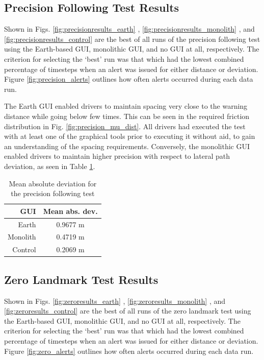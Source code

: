 \subsection{Precision Following Test Results} \label{sec:precisionfollowingresults}

Shown in Figs. \ref{fig:precisionresults_earth} , \ref{fig:precisionresults_monolith} , and \ref{fig:precisionresults_control} are the best of all runs of the precision following test using the Earth-based GUI, monolithic GUI, and no GUI at all, respectively. The criterion for selecting the `best' run was that which had the lowest combined percentage of timesteps when an alert was issued for either distance or deviation. Figure \ref{fig:precision_alerts} outlines how often alerts occurred during each data run.

The Earth GUI enabled drivers to maintain spacing very close to the warning distance while going below few times. This can be seen in the required friction distribution in Fig. \ref{fig:precision_mu_dist}. All drivers had executed the test with at least one of the graphical tools prior to executing it without aid, to gain an understanding of the spacing requirements. Conversely, the monolithic GUI enabled drivers to maintain higher precision with respect to lateral path deviation, as seen in Table \ref{tab:precision_dev_mean}. 

\begin{table}[htbp] \centering \caption{Mean absolute deviation for the precision following test}
\begin{tabular}{r|c} 
    GUI&    Mean abs. dev. \\ \hline\hline
    Earth&      0.9677 m \\
    Monolith&   0.4719 m \\
    Control&    0.2069 m \\ \hline   
\end{tabular} \label{tab:precision_dev_mean} \end{table}



\subsection{Zero Landmark Test Results} \label{sec:zerolandmarkresults}

Shown in Figs. \ref{fig:zeroresults_earth} , \ref{fig:zeroresults_monolith} , and \ref{fig:zeroresults_control} are the best of all runs of the zero landmark test using the Earth-based GUI, monolithic GUI, and no GUI at all, respectively. The criterion for selecting the `best' run was that which had the lowest combined percentage of timesteps when an alert was issued for either distance or deviation. Figure \ref{fig:zero_alerts} outlines how often alerts occurred during each data run.

